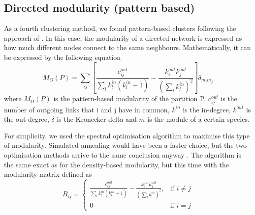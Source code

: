 \documentclass[twocolumn]{article}
\begin{document}
    \subsection*{Directed modularity (pattern based)}
        As a fourth clustering method, we found pattern-based clusters following the approach of \citet{Guimera2010}. In this case, the modularity of a directed network is expressed as how much different nodes connect to the same neighbours. Mathematically, it can be expressed by the following equation \citep{Guimera2007}
        \begin{equation}
            M_O(P)=\sum\limits_{ij}[\frac{c_{ij}^{out}}{\sum\limits_lk_l^{in}(k_l^{in}-1)}-\frac{k_i^{out}k_j^{out}}{(\sum\limits_lk_l^{in})^2}]\delta_{m_im_j}
            \label{eqn:patternbasedmodularity}
        \end{equation}
        \noindent where $M_O(P)$ is the pattern-based modularity of the partition P, $c_{ij}^{out}$ is the number of outgoing links that i and j have in common, $k^{in}$ is the in-degree, $k^{out}$ is the out-degree, $\delta$ is the Kronecker delta and $m$ is the module of a certain species. 
        \par For simplicity, we used the spectral optimisation algorithm to maximise this type of modularity. Simulated annealing would have been a faster choice, but the two optimisation methods arrive to the same conclusion anyway \citet{Guimera2007}. The algorithm is the same exact as for the density-based modularity, but this time with the modularity matrix defined as
        \begin{equation}
            B_{ij} = 
            \begin{cases}
                \frac{c_{ij}^{out}}{\sum\limits_lk_l^{in}(k_l^{in}-1)}-\frac{k_i^{out}k_j^{out}}{(\sum\limits_lk_l^{in})^2}, & \mbox{if } i \neq j \\ 0 & \mbox{if } i=j 
            \end{cases}
        \end{equation} 
\end{document}
